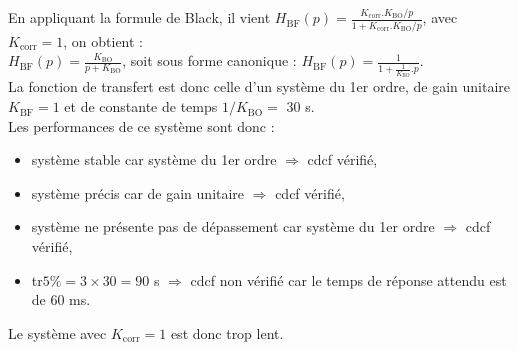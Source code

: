 \begin{multicols}{2}
\begin{center}
\end{center}

\fi



\ifprof
\begin{corrige}
En appliquant la formule de Black, il vient $H_{\text{BF}}(p)= \frac{K_{\text{corr}}.K_{\text{BO}}/p}{1+K_{\text{corr}}.K_{\text{BO}}/p}$, avec $K_{\text{corr}} = 1$, on obtient :\\
$H_{\text{BF}}(p)= \frac{K_{\text{BO}}}{p+K_{\text{BO}}}$, soit sous forme canonique : $H_{\text{BF}}(p)= \frac{1}{1+\frac{1}{K_{\text{BO}}}.p}$.\\
La fonction de transfert est donc celle d'un système du 1er ordre, de gain unitaire $K_{\text{BF}}=1$ et de constante de temps $1/K_{\text{BO}} =$ 30 s.\\
Les performances de ce système sont donc :
\begin{itemize}
\item système stable car système du 1er ordre $ \Rightarrow $ cdcf vérifié,
\item système précis car de gain unitaire $ \Rightarrow $ cdcf vérifié,
\item système ne présente pas de dépassement car système du 1er ordre $ \Rightarrow $ cdcf vérifié,
\item tr$5\% = 3 \times 30 = 90$ s $ \Rightarrow $ cdcf non vérifié car le temps de réponse attendu est de 60 ms.
\end{itemize}
Le système avec $K_{\text{corr}} = 1$ est donc trop lent.
\end{corrige}
\fi


\end{multicols}
